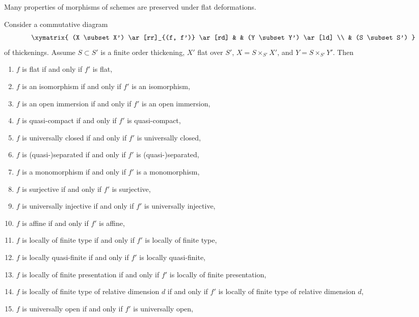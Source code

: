 \noindent
Many properties of morphisms of schemes are preserved under flat
deformations.

\begin{lemma}
\label{lemma-deform-property}
Consider a commutative diagram
$$
\xymatrix{
(X \subset X') \ar[rr]_{(f, f')} \ar[rd] & & (Y \subset Y') \ar[ld] \\
& (S \subset S')
}
$$
of thickenings. Assume $S \subset S'$ is a finite order thickening,
$X'$ flat over $S'$, $X = S \times_{S'} X'$, and
$Y = S \times_{S'} Y'$. Then
\begin{enumerate}
\item $f$ is flat if and only if $f'$ is flat,
\label{item-flat}
\item $f$ is an isomorphism if and only if $f'$ is an isomorphism,
\label{item-isomorphism}
\item $f$ is an open immersion if and only if $f'$ is an open immersion,
\label{item-open-immersion}
\item $f$ is quasi-compact if and only if $f'$ is quasi-compact,
\label{item-quasi-compact}
\item $f$ is universally closed if and only if $f'$ is universally closed,
\label{item-universally-closed}
\item $f$ is (quasi-)separated if and only if $f'$ is (quasi-)separated,
\label{item-separated}
\item $f$ is a monomorphism if and only if $f'$ is a monomorphism,
\label{item-monomorphism}
\item $f$ is surjective if and only if $f'$ is surjective,
\label{item-surjective}
\item $f$ is universally injective if and only if $f'$ is universally injective,
\label{item-universally-injective}
\item $f$ is affine if and only if $f'$ is affine,
\label{item-affine}
\item
\label{item-finite-type}
$f$ is locally of finite type if and only if $f'$ is locally of finite type,
\item $f$ is locally quasi-finite if and only if $f'$ is locally quasi-finite,
\label{item-quasi-finite}
\item
\label{item-finite-presentation}
$f$ is locally of finite presentation if and only if $f'$ is locally of
finite presentation,
\item
\label{item-relative-dimension-d}
$f$ is locally of finite type of relative dimension $d$ if and only if
$f'$ is locally of finite type of relative dimension $d$,
\item $f$ is universally open if and only if $f'$ is universally open,

\end{enumerate}
\end{lemma}
